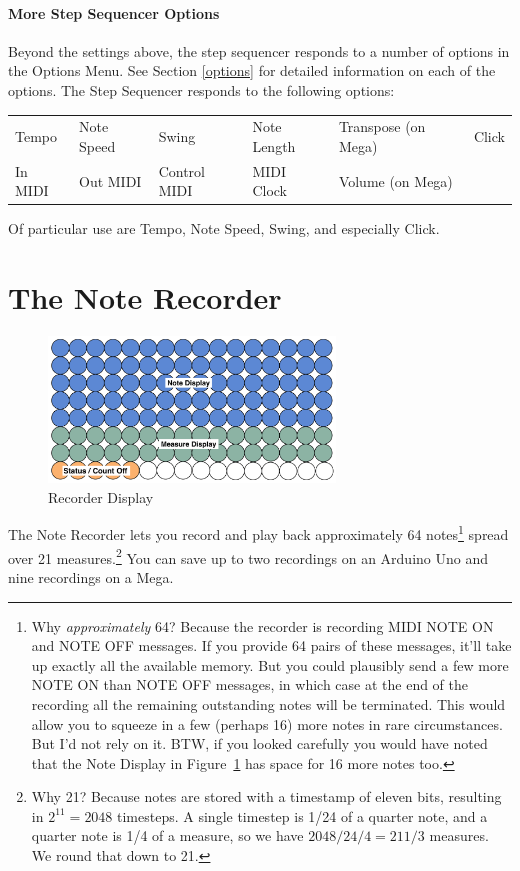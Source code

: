 \documentclass{article}
\begin{document}
\paragraph{More Step Sequencer Options}

Beyond the settings above, the step sequencer responds to a number of options in the Options Menu.  See Section \ref{options} for detailed information on each of the options.  The Step Sequencer responds to the following options:


\vspace{1em}
\begin{tabular}{llllll}
Tempo& Note Speed& Swing & Note Length&Transpose (on Mega)&Click\\
In MIDI& Out MIDI&Control MIDI&MIDI Clock&Volume (on Mega)\\
\end{tabular}

\vspace{1em}
Of particular use are Tempo, Note Speed, Swing, and especially Click.


\clearpage

\section {The Note Recorder}

\begin{figure}
\vspace{-1.5em}\includegraphics[width=3in]{recorder.pdf}
\vspace{-2em}\caption{\small Recorder Display}\vspace{-1em}
\label{recorder}
\end{figure}

The Note Recorder lets you record and play back approximately 64 notes\footnote{Why {\it approximately} 64? Because the recorder is recording MIDI NOTE ON and NOTE OFF messages.  If you provide 64 pairs of these messages, it'll take up exactly all the available memory.  But you could plausibly send a few more NOTE ON than NOTE OFF messages, in which case at the end of the recording all the remaining outstanding notes will be terminated.  This would allow you to squeeze in a few (perhaps 16) more notes in rare circumstances.  But I'd not rely on it.  BTW, if you looked carefully you would have noted that the Note Display in Figure~\ref{recorder} has space for 16 more notes too.} spread over 21 measures.\footnote{Why 21?  Because notes are stored with a timestamp of eleven bits, resulting in \(2^11 = 2048\) timesteps.  A single timestep is 1/24 of a quarter note, and a quarter note is 1/4 of a measure, so we have \(2048 / 24 / 4 = 21 1/3\) measures.  We round that down to 21.}  You can save up to two recordings on an Arduino Uno and nine recordings on a Mega.
\end{document}
